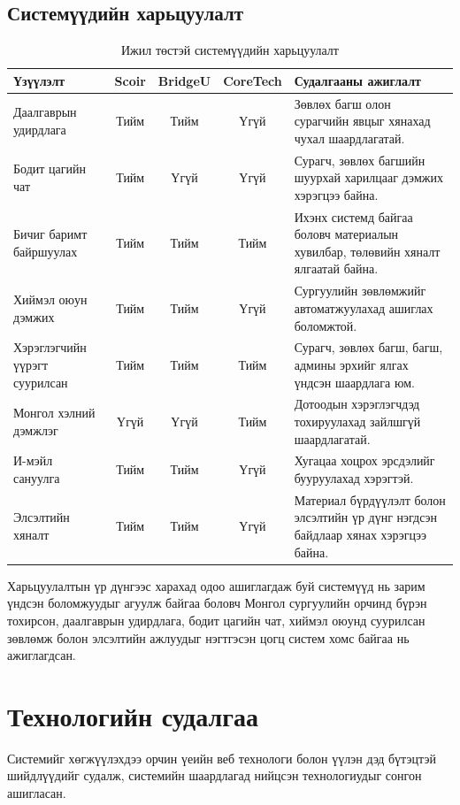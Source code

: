 \subsection{Системүүдийн харьцуулалт}

\begin{table}[H]
\centering
\caption{Ижил төстэй системүүдийн харьцуулалт}
{\small
\renewcommand{\arraystretch}{1.25}
\begin{tabular}{|p{4.2cm}|c|c|c|p{4.2cm}|}
\hline
Үзүүлэлт & Scoir & BridgeU & CoreTech & Судалгааны ажиглалт \\
\hline
Даалгаврын удирдлага & Тийм & Тийм & Үгүй & Зөвлөх багш олон сурагчийн явцыг хянахад чухал шаардлагатай. \\
\hline
Бодит цагийн чат & Тийм & Үгүй & Үгүй & Сурагч, зөвлөх багшийн шуурхай харилцааг дэмжих хэрэгцээ байна. \\
\hline
Бичиг баримт байршуулах & Тийм & Тийм & Тийм & Ихэнх системд байгаа боловч материалын хувилбар, төлөвийн хяналт ялгаатай байна. \\
\hline
Хиймэл оюун дэмжих & Тийм & Тийм & Үгүй & Сургуулийн зөвлөмжийг автоматжуулахад ашиглах боломжтой. \\
\hline
Хэрэглэгчийн үүрэгт суурилсан & Тийм & Тийм & Тийм & Сурагч, зөвлөх багш, багш, админы эрхийг ялгах үндсэн шаардлага юм. \\
\hline
Монгол хэлний дэмжлэг & Үгүй & Үгүй & Тийм & Дотоодын хэрэглэгчдэд тохируулахад зайлшгүй шаардлагатай. \\
\hline
И-мэйл сануулга & Тийм & Тийм & Үгүй & Хугацаа хоцрох эрсдэлийг бууруулахад хэрэгтэй. \\
\hline
Элсэлтийн хяналт & Тийм & Тийм & Үгүй & Материал бүрдүүлэлт болон элсэлтийн үр дүнг нэгдсэн байдлаар хянах хэрэгцээ байна. \\
\hline
\end{tabular}
}
\end{table}

Харьцуулалтын үр дүнгээс харахад одоо ашиглагдаж буй системүүд нь зарим
үндсэн боломжуудыг агуулж байгаа боловч Монгол сургуулийн орчинд бүрэн
тохирсон, даалгаврын удирдлага, бодит цагийн чат, хиймэл оюунд суурилсан
зөвлөмж болон элсэлтийн ажлуудыг нэгтгэсэн цогц систем хомс байгаа нь
ажиглагдсан.

\section{Технологийн судалгаа}

Системийг хөгжүүлэхдээ орчин үеийн веб технологи болон үүлэн дэд бүтэцтэй
шийдлүүдийг судалж, системийн шаардлагад нийцсэн технологиудыг сонгон ашигласан.

